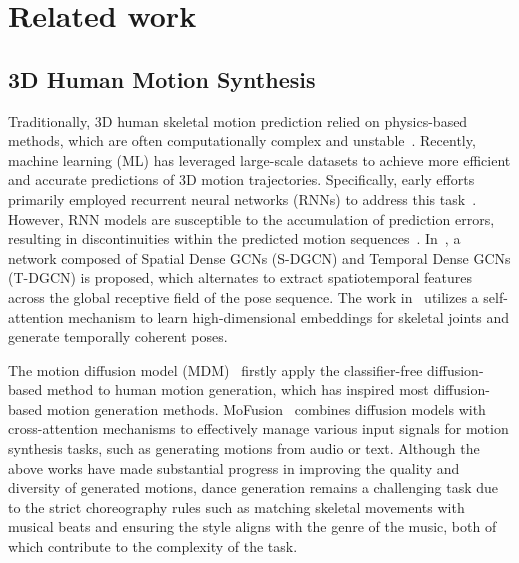 \section{Related work}
\subsection{3D Human Motion Synthesis }
Traditionally, 3D human skeletal motion prediction relied on physics-based methods, which are often computationally complex and unstable~\cite{loi2023machine}. 
Recently, machine learning (ML) has leveraged large-scale datasets to achieve more efficient and accurate predictions of 3D motion trajectories. 
Specifically, early efforts primarily employed recurrent neural networks (RNNs) to address this task~\cite{martinez2017human, li2018convolutional, liu2019towards}. However, RNN models are susceptible to the accumulation of prediction errors, resulting in discontinuities within the predicted motion sequences~\cite{gui2018adversarial}. In~\cite{ma2022progressively}, a network composed of Spatial Dense GCNs (S-DGCN) and Temporal Dense GCNs (T-DGCN) is proposed, which alternates to extract spatiotemporal features across the global receptive field of the pose sequence. The work in~\cite{aksan2021spatio} utilizes a self-attention mechanism to learn high-dimensional embeddings for skeletal joints and generate temporally coherent poses. 

The motion diffusion model (MDM)~\cite{tevet2022humanmotiondiffusionmodel} firstly apply the classifier-free diffusion-based method to human motion generation, which has inspired most diffusion-based motion generation methods.
MoFusion~\cite{dabral2023mofusion} combines diffusion models with cross-attention mechanisms to effectively manage various input signals for motion synthesis tasks, such as generating motions from audio or text.
Although the above works have made substantial progress in improving the quality and diversity of generated motions, dance generation remains a challenging task due to the strict choreography rules such as matching skeletal movements with musical beats and ensuring the style aligns with the genre of the music, both of which contribute to the complexity of the task.
